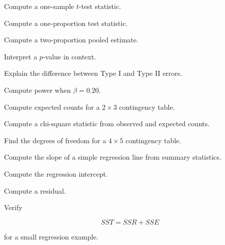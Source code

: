 \begin{exercise}[2]
Compute a one-sample \(t\)-test statistic.
\end{exercise}

\begin{exercise}[2]
Compute a one-proportion test statistic.
\end{exercise}

\begin{exercise}[2]
Compute a two-proportion pooled estimate.
\end{exercise}

\begin{exercise}[2]
Interpret a \(p\)-value in context.
\end{exercise}

\begin{exercise}[2]
Explain the difference between Type I and Type II errors.
\end{exercise}

\begin{exercise}[2]
Compute power when \(\beta=0.20\).
\end{exercise}

\begin{exercise}[2]
Compute expected counts for a \(2\times3\) contingency table.
\end{exercise}

\begin{exercise}[2]
Compute a chi-square statistic from observed and expected counts.
\end{exercise}

\begin{exercise}[2]
Find the degrees of freedom for a \(4\times5\) contingency table.
\end{exercise}

\begin{exercise}[2]
Compute the slope of a simple regression line from summary statistics.
\end{exercise}

\begin{exercise}[2]
Compute the regression intercept.
\end{exercise}

\begin{exercise}[2]
Compute a residual.
\end{exercise}

\begin{exercise}[2]
Verify

\[
SST=SSR+SSE
\]

for a small regression example.
\end{exercise}

